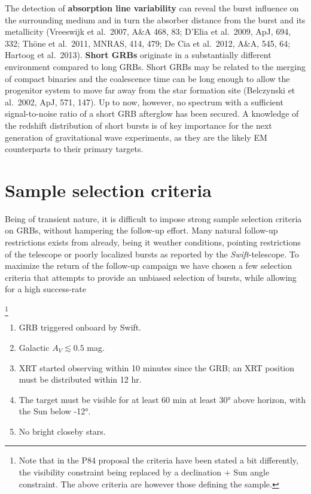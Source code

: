 \documentclass[iop, twocolappendix, numberedappendix, tighten, appendixfloats]{emulateapj}
\begin{document}
	The detection of {\bf absorption line variability} can reveal the burst
	influence on the surrounding medium and in turn the absorber distance from the
	burst and its metallicity (Vreeswijk et al.\ 2007, A\&A 468, 83; D'Elia et al.\
	2009, ApJ, 694, 332; Th\"one et al.\ 2011, MNRAS, 414, 479; De Cia et al.\
	2012, A\&A, 545, 64; Hartoog et al.\ 2013).
	{\bf Short GRBs} originate in a substantially different
	environment compared to long GRBs. Short GRBs may be related to the merging of
	compact binaries and the coalescence time can be long enough to allow the
	progenitor system to move far away from the star formation site (Belczynski et
	al.\ 2002, ApJ, 571, 147). Up to now, however, no spectrum with a sufficient 
	signal-to-noise ratio
	of a short GRB afterglow has been secured.
	A knowledge of the redshift distribution
	of short bursts is of key importance for the next generation of gravitational
	wave experiments, as they are the likely EM counterparts to their
	primary targets.
	
	\cleardoublepage
	
	\section{Sample selection criteria}
	
	Being of transient nature, it is difficult to impose strong sample selection
	criteria on GRBs, without hampering the follow-up effort. Many natural follow-up
	restrictions exists from already, being it weather conditions, pointing
	restrictions of the telescope or poorly localized bursts as reported by the
	\textit{Swift}-telescope. To maximize the return of the follow-up campaign
	we have chosen a few selection criteria that attempts to provide an unbiased
	selection of bursts, while allowing for a high success-rate 
	
	
	
	\footnote{Note that in the P84 proposal the criteria have
	been stated a bit differently, the visibility constraint being replaced by a
	declination + Sun angle constraint. The above criteria are however those
	defining the sample.}

	\begin{enumerate}
		\item GRB triggered onboard by Swift.
		\item Galactic $A_V \lesssim 0.5$ mag.
		\item XRT started observing within 10 minutes since the GRB; an XRT position must be distributed within 12 hr.
		\item The target must be visible for at least 60 min at least 30° above horizon, with the Sun below -12°.
		\item No bright closeby stars.
		
	\end{enumerate}
\end{document}
